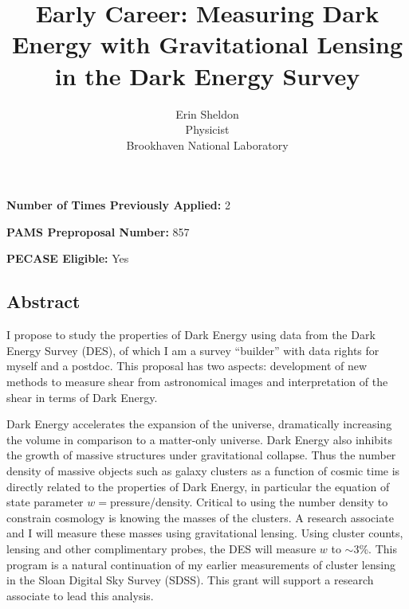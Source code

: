 \documentclass[12pt]{article}
\begin{document}
\vspace{3mm}
\noindent
{\bf Number of Times Previously Applied:} 2

\vspace{3mm}
\noindent
{\bf PAMS Preproposal Number:} 857


\vspace{3mm}
\noindent
{\bf PECASE Eligible:} Yes



\newpage

\tableofcontents

\newpage

\title{Early Career: Measuring Dark Energy with Gravitational Lensing in 
the Dark Energy Survey}
\author{Erin Sheldon\\
{\normalsize Physicist}\\
\normalsize{Brookhaven National Laboratory}}
\date{}
\maketitle

\begin{center}
\section*{Abstract}
\end{center}

I propose to study the properties of Dark Energy using data from the Dark
Energy Survey (DES), of which I am a survey ``builder'' with data rights for
myself and a postdoc.  This proposal has two aspects: development of new
methods to measure shear from astronomical images and interpretation of the
shear in terms of Dark Energy.


Dark Energy accelerates the expansion of the universe, dramatically increasing
the volume in comparison to a matter-only universe.  Dark Energy also inhibits
the growth of massive structures under gravitational collapse.  Thus the number
density of massive objects such as galaxy clusters as a function of cosmic time
is directly related to the properties of Dark Energy, in particular the
equation of state parameter $w=$pressure/density.  Critical to using the number
density to constrain cosmology is knowing the masses of the clusters. A
research associate and I will measure these masses using gravitational lensing.
Using cluster counts, lensing and other complimentary probes, the DES will
measure $w$ to $\sim$3\%.  This program is a natural continuation of my earlier
measurements of cluster lensing in the Sloan Digital Sky Survey (SDSS).  This
grant will support a research associate to lead this analysis.
\end{document}
